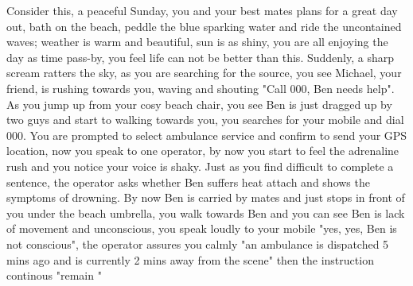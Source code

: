 Consider this, a peaceful Sunday, you and your best mates plans for a great day out, bath on the beach, peddle the blue sparking water and ride the uncontained waves; weather is warm and beautiful, sun is as shiny, you are all enjoying the day as time pass-by, you feel life can not be better than this. Suddenly, a sharp scream ratters the sky, as you are searching for the source, you see Michael, your friend, is rushing towards you, waving and shouting "Call 000, Ben needs help". As you jump up from your cosy beach chair, you see Ben is just dragged up by two guys and start to walking towards you, you searches for your mobile and dial 000. You are prompted to select ambulance service and confirm to send your GPS location, now you speak to one operator, by now you start to feel the adrenaline rush and you notice your voice is shaky. Just as you find difficult to complete a sentence, the operator asks whether Ben suffers heat attach and shows the symptoms of drowning. By now Ben is carried by mates and just stops in front of you under the beach umbrella, you walk towards Ben and you can see Ben is lack of movement and unconscious, you speak loudly to your mobile "yes, yes, Ben is not conscious", the operator assures you calmly "an ambulance is dispatched 5 mins ago and is currently 2 mins away from the scene" then the instruction continous "remain " 